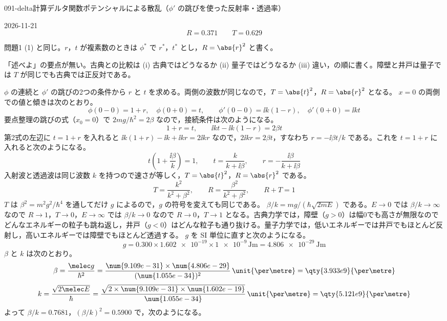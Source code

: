 \documentclass[uplatex,dvipdfmx,a4paper,11pt]{jsarticle}
\begin{document}
\begin{mondai}{091-delta}{計算}{デルタ関数ポテンシャルによる散乱（$\phi'$ の跳びを使った反射率・透過率）}
\begin{kotaeutsushi}{2026-11-21}
\[ R=0.371\qquad T=0.629 \]
\end{kotaeutsushi}
\begin{kizuki}
\item 問題1 (1) と同じ。$r$，$t$ が複素数のときは $\phi^{*}$ で $r^{*}$，$t^{*}$ とし，$R=\abs{r}^{2}$ と書く。
\item {} 「述べよ」の要点が無い。古典との比較は (i) 古典ではどうなるか (ii) 量子ではどうなるか (iii) 違い，の順に書く。障壁と井戸は量子では $T$ が同じでも古典では正反対である。
\end{kizuki}
\begin{tadashii}
\houshin $\phi$ の連続と $\phi'$ の跳びの2つの条件から $r$ と $t$ を求める。両側の波数が同じなので，$T=\abs{t}^{2}$，$R=\abs{r}^{2}$ となる。
\keisan
{} $x=0$ の両側での値と傾きは次のとおり。
\[ \phi(0-0)=1+r,\quad \phi(0+0)=t,\qquad \phi'(0-0)=\ii k(1-r),\quad \phi'(0+0)=\ii kt \]
要点整理の跳びの式（$x_{0}=0$）で $2mg/\hbar^{2}=2\beta$ なので，接続条件は次のようになる。
\[ 1+r=t,\qquad \ii kt-\ii k(1-r)=2\beta t \]
第2式の左辺に $t=1+r$ を入れると $\ii k(1+r)-\ii k+\ii kr=2\ii kr$ なので，$2\ii kr=2\beta t$，すなわち $r=-\ii\beta t/k$ である。これを $t=1+r$ に入れると次のようになる。
\[ t\left(1+\frac{\ii\beta}{k}\right)=1,\qquad t=\frac{k}{k+\ii\beta},\qquad r=-\frac{\ii\beta}{k+\ii\beta} \]
 入射波と透過波は同じ波数 $k$ を持つので速さが等しく，$T=\abs{t}^{2}$，$R=\abs{r}^{2}$ である。
\[ T=\frac{k^{2}}{k^{2}+\beta^{2}},\qquad R=\frac{\beta^{2}}{k^{2}+\beta^{2}},\qquad R+T=1 \]
$T$ は $\beta^{2}=m^{2}g^{2}/\hbar^{4}$ を通してだけ $g$ によるので，$g$ の符号を変えても同じである。
 $\beta/k=mg/(\hbar\sqrt{2mE})$ である。$E\to 0$ では $\beta/k\to\infty$ なので $R\to 1$，$T\to 0$，$E\to\infty$ では $\beta/k\to 0$ なので $R\to 0$，$T\to 1$ となる。古典力学では，障壁（$g>0$）は幅0でも高さが無限なのでどんなエネルギーの粒子も跳ね返し，井戸（$g<0$）はどんな粒子も通り抜ける。量子力学では，低いエネルギーでは井戸でもほとんど反射し，高いエネルギーでは障壁でもほとんど透過する。
 $g$ を SI 単位に直すと次のようになる。
\[ g=\num{0.300}\times\num{1.602e-19}\times\num{1e-9}\,\unit{\joule\metre}=\qty{4.806e-29}{\joule\metre} \]
$\beta$ と $k$ は次のとおり。
\[ \beta=\frac{\melec g}{\hbar^{2}}=\frac{\num{9.109e-31}\times\num{4.806e-29}}{(\num{1.055e-34})^{2}}\,\unit{\per\metre}=\qty{3.933e9}{\per\metre} \]
\[ k=\frac{\sqrt{2\melec E}}{\hbar}=\frac{\sqrt{2\times\num{9.109e-31}\times\num{1.602e-19}}}{\num{1.055e-34}}\,\unit{\per\metre}=\qty{5.121e9}{\per\metre} \]
よって $\beta/k=\num{0.7681}$，$(\beta/k)^{2}=\num{0.5900}$ で，次のようになる。

\end{tadashii}
\end{mondai}
\end{document}
